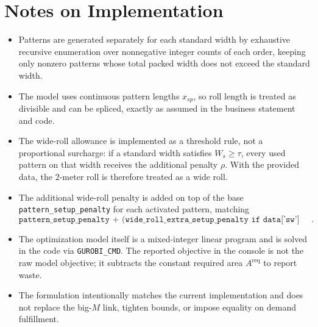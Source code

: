 \section*{Notes on Implementation}

\begin{itemize}
\item Patterns are generated separately for each standard width by exhaustive recursive enumeration over nonnegative integer counts of each order, keeping only nonzero patterns whose total packed width does not exceed the standard width.
\item The model uses continuous pattern lengths $x_{sp}$, so roll length is treated as divisible and can be spliced, exactly as assumed in the business statement and code.
\item The wide-roll allowance is implemented as a threshold rule, not a proportional surcharge: if a standard width satisfies $W_s \ge \tau$, every used pattern on that width receives the additional penalty $\rho$. With the provided data, the 2-meter roll is therefore treated as a wide roll.
\item The additional wide-roll penalty is added on top of the base \texttt{pattern\_setup\_penalty} for each activated pattern, matching
\[
\texttt{pattern\_setup\_penalty + (wide\_roll\_extra\_setup\_penalty if data['sw'] >= wide\_roll\_threshold\_width else 0.0)}.
\]
\item The optimization model itself is a mixed-integer linear program and is solved in the code via \texttt{GUROBI\_CMD}. The reported objective in the console is not the raw model objective; it subtracts the constant required area $A^{\mathrm{req}}$ to report waste.
\item The formulation intentionally matches the current implementation and does not replace the big-$M$ link, tighten bounds, or impose equality on demand fulfillment.
\end{itemize}
